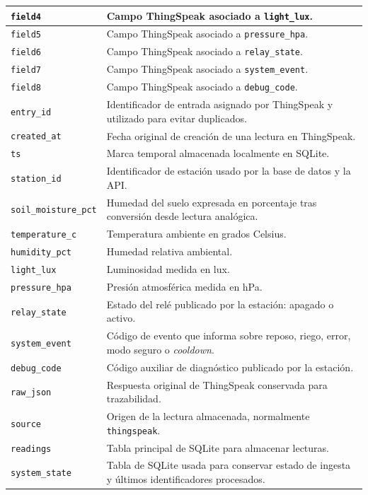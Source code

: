 \begin{longtable}{|p{}|p{}|}
\hline
\texttt{field4} & Campo ThingSpeak asociado a \texttt{light\_lux}. \\
\hline
\texttt{field5} & Campo ThingSpeak asociado a \texttt{pressure\_hpa}. \\
\hline
\texttt{field6} & Campo ThingSpeak asociado a \texttt{relay\_state}. \\
\hline
\texttt{field7} & Campo ThingSpeak asociado a \texttt{system\_event}. \\
\hline
\texttt{field8} & Campo ThingSpeak asociado a \texttt{debug\_code}. \\
\hline
\texttt{entry\_id} & Identificador de entrada asignado por ThingSpeak y utilizado para evitar duplicados. \\
\hline
\texttt{created\_at} & Fecha original de creación de una lectura en ThingSpeak. \\
\hline
\texttt{ts} & Marca temporal almacenada localmente en SQLite. \\
\hline
\texttt{station\_id} & Identificador de estación usado por la base de datos y la API. \\
\hline
\texttt{soil\_moisture\_pct} & Humedad del suelo expresada en porcentaje tras conversión desde lectura analógica. \\
\hline
\texttt{temperature\_c} & Temperatura ambiente en grados Celsius. \\
\hline
\texttt{humidity\_pct} & Humedad relativa ambiental. \\
\hline
\texttt{light\_lux} & Luminosidad medida en lux. \\
\hline
\texttt{pressure\_hpa} & Presión atmosférica medida en hPa. \\
\hline
\texttt{relay\_state} & Estado del relé publicado por la estación: apagado o activo. \\
\hline
\texttt{system\_event} & Código de evento que informa sobre reposo, riego, error, modo seguro o \textit{cooldown}. \\
\hline
\texttt{debug\_code} & Código auxiliar de diagnóstico publicado por la estación. \\
\hline
\texttt{raw\_json} & Respuesta original de ThingSpeak conservada para trazabilidad. \\
\hline
\texttt{source} & Origen de la lectura almacenada, normalmente \texttt{thingspeak}. \\
\hline
\texttt{readings} & Tabla principal de SQLite para almacenar lecturas. \\
\hline
\texttt{system\_state} & Tabla de SQLite usada para conservar estado de ingesta y últimos identificadores procesados. \\

\end{longtable}
